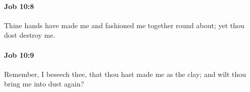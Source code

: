 		\paragraph{Job 10:8} %
			\label{JOB-10-8}

			Thine hands have made me and fashioned me together round about; yet thou dost destroy me.


		\paragraph{Job 10:9} %
			\label{JOB-10-9}

			Remember, I beseech thee, that thou hast made me as the clay; and wilt thou bring me into dust again?


